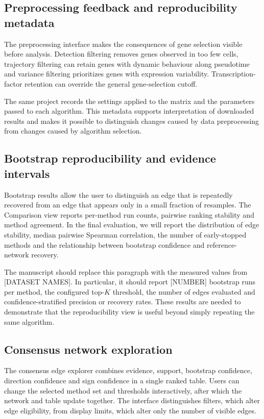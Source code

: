 \documentclass[unnumsec,webpdf,modern,large]{oup-authoring-template}%
\begin{document}
\subsection{Preprocessing feedback and reproducibility metadata}

The preprocessing interface makes the consequences of gene selection visible before analysis. Detection filtering removes genes observed in too few cells, trajectory filtering can retain genes with dynamic behaviour along pseudotime and variance filtering prioritizes genes with expression variability. Transcription-factor retention can override the general gene-selection cutoff.

The same project records the settings applied to the matrix and the parameters passed to each algorithm. This metadata supports interpretation of downloaded results and makes it possible to distinguish changes caused by data preprocessing from changes caused by algorithm selection.

\subsection{Bootstrap reproducibility and evidence intervals}

Bootstrap results allow the user to distinguish an edge that is repeatedly recovered from an edge that appears only in a small fraction of resamples. The Comparison view reports per-method run counts, pairwise ranking stability and method agreement. In the final evaluation, we will report the distribution of edge stability, median pairwise Spearman correlation, the number of early-stopped methods and the relationship between bootstrap confidence and reference-network recovery.

The manuscript should replace this paragraph with the measured values from [DATASET NAMES]. In particular, it should report [NUMBER] bootstrap runs per method, the configured top-$K$ threshold, the number of edges evaluated and confidence-stratified precision or recovery rates. These results are needed to demonstrate that the reproducibility view is useful beyond simply repeating the same algorithm.

\subsection{Consensus network exploration}

The consensus edge explorer combines evidence, support, bootstrap confidence, direction confidence and sign confidence in a single ranked table. Users can change the selected method set and thresholds interactively, after which the network and table update together. The interface distinguishes filters, which alter edge eligibility, from display limits, which alter only the number of visible edges.
\end{document}
